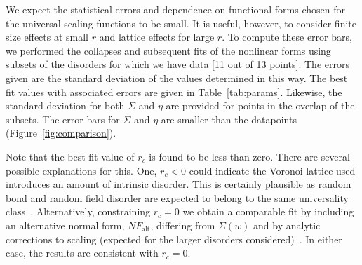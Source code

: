 \documentclass[reprint,amsmath,amssymb,aps,floatfix]{revtex4-1}
\begin{document}
%
We expect the statistical errors and dependence on functional forms chosen for the universal scaling functions to be small. It is useful, however, to consider finite size effects at small $r$ and lattice effects for large $r$.  To compute these error bars,  we performed the collapses and subsequent fits of the nonlinear forms using subsets of the disorders for which we have data [11 out of 13 points]. The errors given are the standard deviation of the values determined in this way. The best fit values with associated errors are given in Table~\ref{tab:params}. Likewise, the standard deviation for both $\Sigma$ and $\eta$ are provided for points in the overlap of the subsets. The error bars for $\Sigma$ and $\eta$ are smaller than the datapoints (Figure~\ref{fig:comparison}). \par
%
Note that the best fit value of $r_c$ is found to be less than zero. There are several possible explanations for this. One, $r_c<0$ could indicate the Voronoi lattice used introduces an amount of intrinsic disorder. This is certainly plausible as random bond and random field disorder are expected to belong to the same universality class~\cite{Dahmen96, Vives95}. Alternatively, constraining $r_c=0$ we obtain a comparable fit by including an alternative normal form, $NF_{\textrm{alt}}$, differing from $\Sigma(w)$ and by analytic corrections to scaling (expected for the larger disorders considered)~\cite[Section~\ref{supp-app:well-behaved}]{RFIM2Dsupp}. In either case, the results are consistent with $r_c=0.$ \par
%
\end{document}
